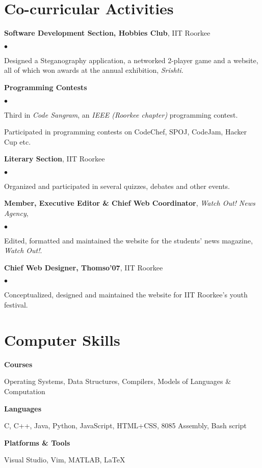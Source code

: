 \documentclass[margin,line]{res}
\newenvironment{list1}{
  \begin{list}{\ding{113}}{%
      \setlength{\itemsep}{0in}
      \setlength{\parsep}{0in} \setlength{\parskip}{0in}
      \setlength{\topsep}{0in} \setlength{\partopsep}{0in} 
      \setlength{\leftmargin}{0.17in}}}{\end{list}}
\newenvironment{list2}{
  \begin{list}{$\bullet$}{%
      \setlength{\itemsep}{0in}
      \setlength{\parsep}{0in} \setlength{\parskip}{0in}
      \setlength{\topsep}{0in} \setlength{\partopsep}{0in} 
      \setlength{\leftmargin}{0.2in}}}{\end{list}}
\begin{document}
\begin{resume}
\section{\sc Co-curricular Activities} 
{\bf Software Development Section, Hobbies Club}, IIT Roorkee
\begin{list2}
\item Designed a Steganography application, a networked 2-player game and a website, all of which won awards at the annual exhibition, {\em Srishti}.
\end{list2}
{\bf Programming Contests}
\begin{list2}
\item Third in {\em Code Sangram}, an {\em IEEE (Roorkee chapter)} programming contest.
\item Participated in programming contests on CodeChef, SPOJ, CodeJam, Hacker Cup etc.
\end{list2}
{\bf Literary Section}, IIT Roorkee
\begin{list2}
\item Organized and participated in several quizzes, debates and other events.
\end{list2}
{\bf Member, Executive Editor \& Chief Web Coordinator}, {\em Watch Out! News Agency},
\begin{list2}
\item Edited, formatted  and maintained the website for the students' news magazine, {\em Watch Out!}.
\end{list2}
{\bf Chief Web Designer, Thomso'07}, IIT Roorkee
\begin{list2}
\item Conceptualized, designed and maintained the website for IIT Roorkee's youth festival.
\end{list2}

\section{\sc Computer Skills} 
\textbf{Courses}
	\begin{list1}
		\item[]  Operating Systems, Data Structures, Compilers, Models of Languages \& Computation
	\end{list1}

\textbf{Languages}
	\begin{list1}
		\item[]  C, C++, Java, Python, JavaScript, HTML+CSS, 8085 Assembly, Bash script
	\end{list1}

\textbf{Platforms \& Tools}
	\begin{list1}
		\item[] Visual Studio, Vim, MATLAB, \LaTeX{}
	\end{list1}

\end{resume}
\end{document}
